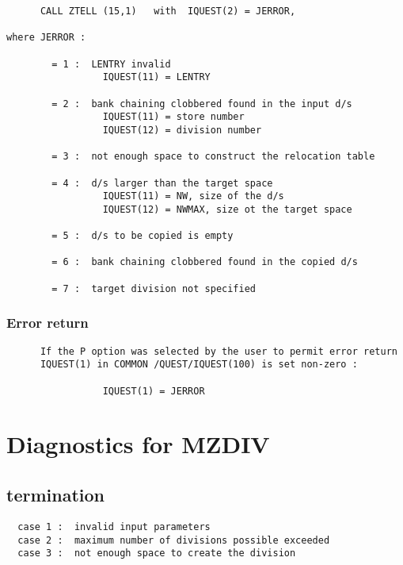 \begin{verbatim}
      CALL ZTELL (15,1)   with  IQUEST(2) = JERROR,

where JERROR :

        = 1 :  LENTRY invalid
                 IQUEST(11) = LENTRY

        = 2 :  bank chaining clobbered found in the input d/s
                 IQUEST(11) = store number
                 IQUEST(12) = division number

        = 3 :  not enough space to construct the relocation table

        = 4 :  d/s larger than the target space
                 IQUEST(11) = NW, size of the d/s
                 IQUEST(12) = NWMAX, size ot the target space

        = 5 :  d/s to be copied is empty

        = 6 :  bank chaining clobbered found in the copied d/s

        = 7 :  target division not specified
\end{verbatim}

\subsubsection*{Error return}

\begin{verbatim}
      If the P option was selected by the user to permit error return
      IQUEST(1) in COMMON /QUEST/IQUEST(100) is set non-zero :

                 IQUEST(1) = JERROR
\end{verbatim}

\section{Diagnostics for MZDIV}


\subsection*{ termination}

\begin{verbatim}
  case 1 :  invalid input parameters
  case 2 :  maximum number of divisions possible exceeded
  case 3 :  not enough space to create the division
\end{verbatim}

